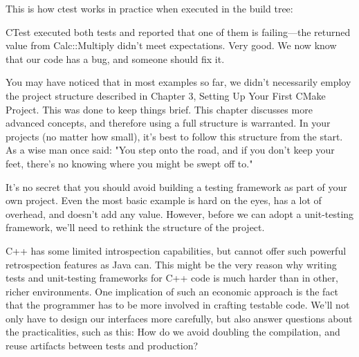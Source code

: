 This is how ctest works in practice when executed in the build tree:


CTest executed both tests and reported that one of them is failing—the returned value from Calc::Multiply didn't meet expectations. Very good. We now know that our code has a bug, and someone should fix it.

\begin{tcolorbox}[colback=blue!5!white,colframe=blue!75!black,title=Note]
You may have noticed that in most examples so far, we didn't necessarily employ the project structure described in Chapter 3, Setting Up Your First CMake Project. This was done to keep things brief. This chapter discusses more advanced concepts, and therefore using a full structure is warranted. In your projects (no matter how small), it's best to follow this structure from the start. As a wise man once said: "You step onto the road, and if you don't keep your feet, there's no knowing where you might be swept off to."
\end{tcolorbox}

It's no secret that you should avoid building a testing framework as part of your own project. Even the most basic example is hard on the eyes, has a lot of overhead, and doesn't add any value. However, before we can adopt a unit-testing framework, we'll need to rethink the structure of the project.


C++ has some limited introspection capabilities, but cannot offer such powerful retrospection features as Java can. This might be the very reason why writing tests and unit-testing frameworks for C++ code is much harder than in other, richer environments. One implication of such an economic approach is the fact that the programmer has to be more involved in crafting testable code. We'll not only have to design our interfaces more carefully, but also answer questions about the practicalities, such as this: How do we avoid doubling the compilation, and reuse artifacts between tests and production?

